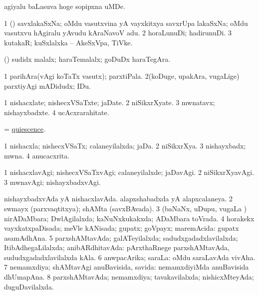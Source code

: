 \bentry
{}
\gl{\nA}
\expl{}
\bmng
agiyalu baLasuva hoge sopipxna uMDe. 
\emng
\eentry

\bentry
{}
\gl{\nA}
\bmng
\bnum
\num{1} (\tashA) savxlakaSxNa; oMdu vasutxvina yA vayxkitxya savxrUpa lakaSxNa; oMdu vasutxvu hAgiralu yAvudu kAraNavoV adu. 
\num{2} horaLunuDi; hadirunuDi. 
\num{3} kutakaR; kuSxlalxka -- AkeSxVpa, TiVke. 
\enum
\emng
\eentry

\bentry
{}
\gl{\nA}
\expl{}
\bmng
(\pArxparx) sudidx malalx; haraTemalalx; goDuDx haraTegAra. 
\emng
\eentry

\bentry
{}
\gl{\nA}
\bmng
\bnum
\num{1} parihAra(vAgi koTaTx vasutx); parxtiPala. 
\num{2}(koDuge, upakAra, \mo vugaLige) parxtiyAgi mADidudx; IDu. 
\enum
\emng
\eentry

\bentry
{}
\gl{\nA}
\bmng
\bnum
\num{1} nishacxlate; nishecxVSaTxte; jaDate. 
\num{2} niSikxrXyate. 
\num{3} mwnatavx; nishayxbadxte. 
\num{4} ucAcxrarahitate. 
\enum
\emng
\eentry

\bentry
{}
\gl{\nA}
\bmng
= \hyperlink{quiescence}{quiescence}. 
\emng
\eentry

\bentry
{}
\gl{\gu}
\bmng
\bnum
\num{1} nishacxla; nishecxVSaTx; calaneyilalxda; jaDa. 
\num{2} niSikxrXya. 
\num{3} nishayxbadx; mwna. 
\num{4} anucacxrita. 
\enum
\emng
\eentry

\bentry
{}
\gl{\kirxvi}
\bmng
\bnum
\num{1} nishacxlavAgi; nishecxVSaTxvAgi; calaneyilalxde; jaDavAgi. 
\num{2} niSikxrXyavAgi. 
\num{3} mwnavAgi; nishayxbadxvAgi. 
\enum
\emng
\eentry

\bentry
{}
\gl{\gu}
\bmng
\bnum
{} 
\banum
{} nishayxbadxvAda yA nishacxlavAda. 
 alapxshabadxda yA alapxcalaneya. 
\eanum
\numie
\num{2} swmayx (parxvaqtitxya); shAMta (savxBAvada). 
\num{3} (baNaNx, uDupu, \mo vugaLa \vi) nirADaMbara; DwlAgilalxda; kaNuNxkukakxda; ADaMbara toVrada. 
\num{4} horakekx vayxkatxpaDisada; meVle kANisada; gupatx; goVpayx; maremAcida:  gupatx asamAdhAna. 
\num{5} parxshAMtavAda; galATeyilalxda; sadudxgadadxlavilalxda; ItibAdhegaLilalxda; anibARdhitavAda:  pArxthaRnege parxshAMtavAda, sududxgadadxlavilalxda kAla. 
\num{6} anwpacArika; saraLa:  oMdu saraLavAda vivAha. 
\num{7} nemamxdiya; shAMtavAgi anuBavisida, savida:  nemamxdiyiMda anuBavisida dhUmapAna. 
\num{8} parxshAMtavAda; nemamxdiya; tavakavilalxda; nishicxMteyAda; duguDavilalxda. 
\enum
\emng

